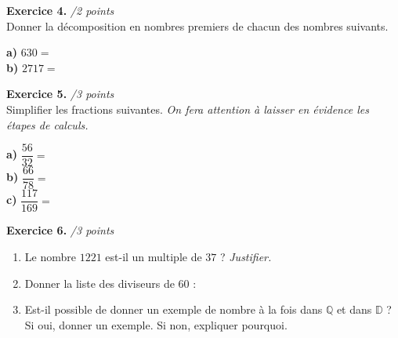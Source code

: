 \documentclass[11pt]{article}
\begin{document}
\noindent \textbf{Exercice 4.} \hspace{2cm}\emph{/2 points}\\
Donner la décomposition en nombres premiers de chacun des nombres suivants.
\begin{multicols}{2}
  \noindent \textbf{a)} $630=$\\
  \textbf{b) }$2717=$
\end{multicols}

\noindent \textbf{Exercice 5.} \hspace{2cm}\emph{/3 points}\\
Simplifier les fractions suivantes. \emph{On fera attention à laisser en
évidence les étapes de calculs.}
\begin{multicols}{3}
  \noindent \textbf{a)} $\dfrac{56}{32}=$\\
  \textbf{b)} $\dfrac{66}{78}=$\\
  \textbf{c)} $\dfrac{117}{169}=$
\end{multicols}
\vspace{1.5cm}

\noindent \textbf{Exercice 6.} \hspace{2cm}\emph{/3 points}
\begin{enumerate}
  \item Le nombre $1221$ est-il un multiple de $37$ ?
    \emph{Justifier.}\vspace{1.5cm}
  \item Donner la liste des diviseurs de $60$ :
  \item Est-il possible de donner un exemple de nombre à la fois dans
    $\mathbb{Q}$ et dans $\mathbb{D}$ ? Si oui, donner un exemple. Si non,
    expliquer pourquoi.
\end{enumerate}
\end{document}
